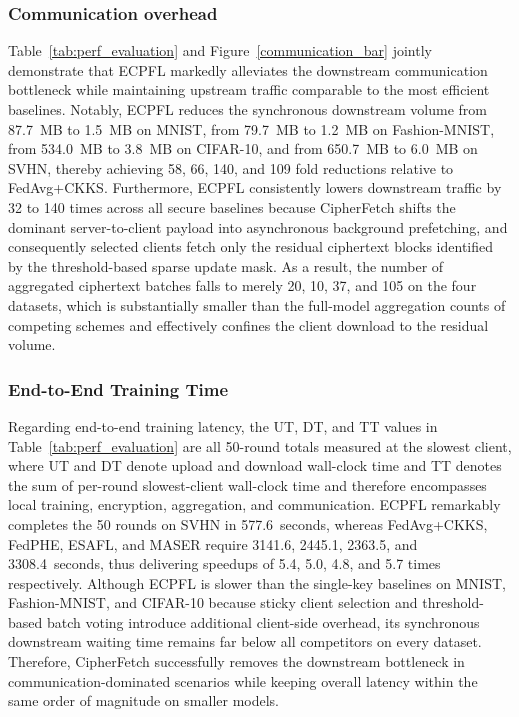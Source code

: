 \subsubsection{Communication overhead}
Table~\ref{tab:perf_evaluation} and Figure~\ref{communication_bar} jointly demonstrate that ECPFL markedly alleviates the downstream communication bottleneck while maintaining upstream traffic comparable to the most efficient baselines.
Notably, ECPFL reduces the synchronous downstream volume from 87.7~MB to 1.5~MB on MNIST, from 79.7~MB to 1.2~MB on Fashion-MNIST, from 534.0~MB to 3.8~MB on CIFAR-10, and from 650.7~MB to 6.0~MB on SVHN, thereby achieving 58, 66, 140, and 109 fold reductions relative to FedAvg+CKKS.
Furthermore, ECPFL consistently lowers downstream traffic by 32 to 140 times across all secure baselines because CipherFetch shifts the dominant server-to-client payload into asynchronous background prefetching, and consequently selected clients fetch only the residual ciphertext blocks identified by the threshold-based sparse update mask.
As a result, the number of aggregated ciphertext batches falls to merely 20, 10, 37, and 105 on the four datasets, which is substantially smaller than the full-model aggregation counts of competing schemes and effectively confines the client download to the residual volume.

\subsubsection{End-to-End Training Time}
Regarding end-to-end training latency, the UT, DT, and TT values in Table~\ref{tab:perf_evaluation} are all 50-round totals measured at the slowest client, where UT and DT denote upload and download wall-clock time and TT denotes the sum of per-round slowest-client wall-clock time and therefore encompasses local training, encryption, aggregation, and communication.
ECPFL remarkably completes the 50 rounds on SVHN in 577.6~seconds, whereas FedAvg+CKKS, FedPHE, ESAFL, and MASER require 3141.6, 2445.1, 2363.5, and 3308.4~seconds, thus delivering speedups of 5.4, 5.0, 4.8, and 5.7 times respectively.
Although ECPFL is slower than the single-key baselines on MNIST, Fashion-MNIST, and CIFAR-10 because sticky client selection and threshold-based batch voting introduce additional client-side overhead, its synchronous downstream waiting time remains far below all competitors on every dataset.
Therefore, CipherFetch successfully removes the downstream bottleneck in communication-dominated scenarios while keeping overall latency within the same order of magnitude on smaller models.
